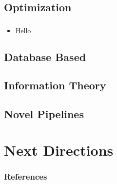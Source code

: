 \documentclass[pdf]{beamer}
\begin{document}
\subsection{Optimization}
\begin{frame}
  \frametitle{}
  \begin{itemize}
    \item Hello
  \end{itemize}
\end{frame}


\subsection{Database Based}

\subsection{Information Theory}

\subsection{Novel Pipelines}

\section{Next Directions}



\begin{frame}[allowframebreaks]
  \frametitle{References}
  
  
\end{frame}
\end{document}
